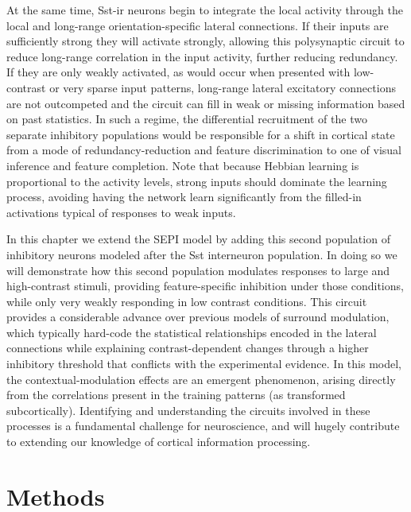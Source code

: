 At the same time, Sst-ir neurons begin to integrate the local activity
through the local and long-range orientation-specific lateral
connections. If their inputs are sufficiently strong they will
activate strongly, allowing this polysynaptic circuit to reduce
long-range correlation in the input activity, further reducing
redundancy. If they are only weakly activated, as would occur when
presented with low-contrast or very sparse input patterns, long-range
lateral excitatory connections are not outcompeted and the circuit can
fill in weak or missing information based on past statistics. In such
a regime, the differential recruitment of the two separate inhibitory
populations would be responsible for a shift in cortical state from a
mode of redundancy-reduction and feature discrimination to one of
visual inference and feature completion.  Note that because Hebbian
learning is proportional to the activity levels, strong inputs should
dominate the learning process, avoiding having the network learn
significantly from the filled-in activations typical of responses to
weak inputs.

In this chapter we extend the SEPI model by adding this second
population of inhibitory neurons modeled after the Sst interneuron
population. In doing so we will demonstrate how this second population
modulates responses to large and high-contrast stimuli, providing
feature-specific inhibition under those conditions, while only very
weakly responding in low contrast conditions. This circuit provides a
considerable advance over previous models of surround modulation,
which typically hard-code the statistical relationships encoded in the
lateral connections while explaining contrast-dependent changes
through a higher inhibitory threshold that conflicts with the
experimental evidence. In this model, the contextual-modulation
effects are an emergent phenomenon, arising directly from the
correlations present in the training patterns (as transformed
subcortically).  Identifying and understanding the circuits involved
in these processes is a fundamental challenge for neuroscience, and
will hugely contribute to extending our knowledge of cortical
information processing.

\section{Methods}

